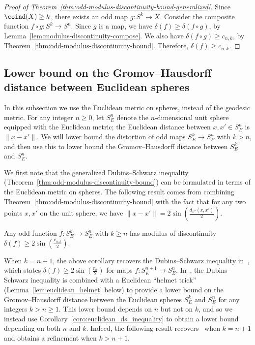 \documentclass[11pt, reqno, english]{amsart}
\begin{document}
\begin{proof}[Proof of Theorem~\ref{thm:odd-modulus-discontinuity-bound-generalized}]
Since $\coind(X) \ge k$, there exists an odd map $g \colon S^{k} \to X$.
Consider the composite function $f \circ g \colon S^{k} \to S^{n}$.
Since $g$ is a map, we have $\delta(f) \ge \delta(f \circ g)$, by Lemma~\ref{lem:modulus-discontinuity-compose}.
We also have $\delta(f \circ g) \ge c_{n, k}$, by Theorem~\ref{thm:odd-modulus-discontinuity-bound}.
Therefore, $\delta(f) \ge c_{n, k}$.
\end{proof}


\subsection{Lower bound on the Gromov--Hausdorff distance between Euclidean spheres}
\label{ssec:Euclidean}

In this subsection we use the Euclidean metric on spheres, instead of the geodesic metric.
For any integer $n\geq 0$, let $S_E^n$ denote the $n$-dimensional unit sphere equipped with the Euclidean metric; the Euclidean distance between $x,x' \in S_E^n$ is $\|x-x'\|$.
We will lower bound the distortion of odd maps $S_E^k \to S_E^n$ with $k>n$, and then use this to lower bound the Gromov--Hausdorff distance between $S_E^k$ and $S_E^n$.

We first note that the generalized Dubins--Schwarz inequality (Theorem~\ref{thm:odd-modulus-discontinuity-bound}) can be formulated in terms of the Euclidean metric on spheres.
The following result comes from combining Theorem~\ref{thm:odd-modulus-discontinuity-bound} with the fact that for any two points $x, x'$ on the unit sphere, we have $\|x - x'\| = 2\sin\left(\tfrac{d_{S^n}(x, x')}{2}\right)$.

\begin{corollary}\label{coro:euclidean_ds_inequality}
Any odd function $f\colon S_E^k \to S_E^n$ with $k \ge n$ has modulus of discontinuity $\delta(f)\geq 2\sin\left(\tfrac{c_{n,k}}{2}\right)$.
\end{corollary}

When $k= n+1$, the above corollary recovers the Dubins--Schwarz inequality in~\cite{dubins1981equidiscontinuity}, which states $\delta(f)\geq 2\sin\left(\tfrac{r_n}{2}\right)$ for maps $f\colon S_E^{n+1} \to S_E^n$.
In~\cite[Proposition~9.16]{lim2021gromov}, the Dubins--Schwarz inequality is combined with a Euclidean ``helmet trick'' (Lemma~\ref{lem:euclidean_helmet} below) to provide a lower bound on the Gromov--Hausdorff distance between the Euclidean spheres $S_E^{k}$ and $S_E^{n}$ for any integers $k>n\geq 1$.
This lower bound depends on $n$ but not on $k$, and so we instead use Corollary~\ref{coro:euclidean_ds_inequality} to obtain a lower bound depending on both $n$ and $k$.
Indeed, the following result recovers~\cite[Proposition~9.16]{lim2021gromov} when $k = n+1$ and obtains a refinement when $k> n+1$.
\end{document}
